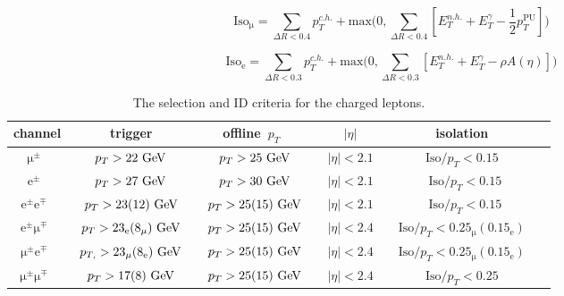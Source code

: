 \begin{equation}
\label{eq:iso_mu}
\mathrm{Iso}_{\mathrm{\mu}} = \sum_{\Delta R < 0.4} p_T^{c.h.} + \mathrm{max}\biggl(0, \sum_{\Delta R < 0.4} [E_T^{n.h.} + E_T^{\gamma} - \frac{1}{2} p_T^{\mathrm{PU}}] \biggr)
\end{equation}

\begin{equation}
\label{eq:iso_el}
\mathrm{Iso}_{\mathrm{e}} = \sum_{\Delta R < 0.3} p_T^{c.h.} + \mathrm{max}\biggl(0, \sum_{\Delta R < 0.3} [E_T^{n.h.} + E_T^{\gamma} - \rho A(\eta)] \biggr)
\end{equation}

\begin{table}[h!]
\begin{center}
\caption{The selection and ID criteria for the charged leptons.}
\label{tab:lepton_selection}
\begin{tabular}{c|ccccc}
\hline
channel & trigger & offline~$p_T$~&~$|\eta|$~& isolation \\
\hline
$\mathrm{\mu}^\pm$~&~$p_T > 22~\mathrm{GeV}$~&~$p_T > 25~\mathrm{GeV}$~&~$|\eta| < 2.1$~& ~$\mathrm{Iso}/p_T < 0.15$~\\

$\mathrm{e}^\pm$~&~$p_T > 27~\mathrm{GeV}$~&~$p_T > 30~\mathrm{GeV}$~&~$|\eta| < 2.1$~&~$\mathrm{Iso}/p_T < 0.15$\\

$\mathrm{e}^\pm\mathrm{e}^\mp$~&~$p_T > 23 (12)~\mathrm{GeV}$~&~$p_T > 25 (15)~\mathrm{GeV}$~&~$|\eta| < 2.1$~&~$\mathrm{Iso}/p_T < 0.15$\\

$\mathrm{e}^\pm\mathrm{\mu}^\mp$~&~$p_{T} > 23_{\mathrm{e}} (8_{\mathrm{\mu}})~\mathrm{GeV}$~&~$p_T > 25 (15)~\mathrm{GeV}$~&~$|\eta| < 2.4$~&~$\mathrm{Iso}/p_T < 0.25_{\mathrm{\mu}} (0.15_{\mathrm{e}})$~\\

$\mathrm{\mu}^\pm\mathrm{e}^\mp$~&~$p_{T,} > 23_{\mathrm{\mu}} (8_{\mathrm{e}})~\mathrm{GeV}$~&~$p_T > 25 (15)~\mathrm{GeV}$~&~$|\eta| < 2.4$~&~$\mathrm{Iso}/p_T < 0.25_{\mathrm{\mu}} (0.15_{\mathrm{e}})$~\\

$\mathrm{\mu}^\pm\mathrm{\mu}^\mp$~&~$p_T > 17 (8)~\mathrm{GeV}$~&~$p_T > 25 (15)~\mathrm{GeV}$~&~$|\eta| < 2.4$~&~$\mathrm{Iso}/p_T < 0.25$~\\

\hline
\hline
\end{tabular}
\end{center}
\end{table}

